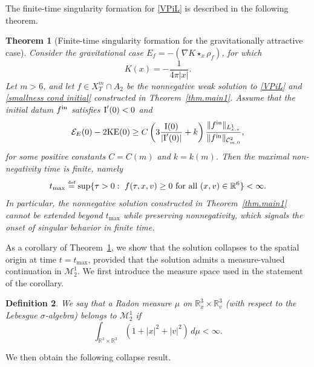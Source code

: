 \documentclass[reqno,11pt,final]{amsart}
\theoremstyle{plain}
\newtheorem{theorem}{Theorem}
\newtheorem{definition}[theorem]{Definition}
\numberwithin{equation}{section}
\numberwithin{theorem}{section}
\newcommand{\eqdef }{\overset{\mbox{\tiny{def}}}{=}}
\begin{document}
The finite-time singularity formation for \eqref{VPiL} is described in the following theorem.

\begin{theorem}[Finite-time singularity formation for the gravitationally attractive case]
\label{thm.main2}
Consider the gravitational case $E_f = -(\nabla K\star_x\rho_f)$, for which
$$
K(x) = -\frac{1}{4\pi|x|}.
$$
Let $m>6$, and let $f \in X_T^m\cap A_2$ be the nonnegative weak solution to
\eqref{VPiL} and \eqref{smallness cond initial} constructed in
Theorem~\ref{thm.main1}. Assume that the initial datum $f^{\textup{in}}$
satisfies $\textup{I}'(0)<0$ and
\begin{align}\label{inertia < energy}
\mathcal{E}_E(0) - 2\textup{KE}(0)
\ge
C\left(3\frac{\textup{I}(0)}{|\textup{I}'(0)|} +k\right)
\frac{\lVert f^{\textup{in}}\rVert_{L^1_{x,v}}}{\|f^{\textup{in}}\|_{\mathcal{C}^2_{m,0}}},
\end{align}
for some positive constants $C=C(m)$ and $k=k(m)$.
Then the maximal non-negativity time is finite, namely
$$
t_{\max}
\eqdef
\sup\{\tau>0:\ f(\tau,x,v)\ge 0
\ \text{for all }(x,v)\in\mathbb{R}^6\}
<\infty .
$$
In particular, the nonnegative solution constructed in
Theorem~\ref{thm.main1} cannot be extended beyond $t_{\max}$ while
preserving nonnegativity, which signals the onset of singular behavior
in finite time.
\end{theorem}

As a corollary of Theorem~\ref{thm.main2}, we show that the solution
collapses to the spatial origin at time $t=t_{\max}$, provided that the
solution admits a measure-valued continuation in $\mathcal{M}^1_2$.
We first introduce the measure space used in the statement of the
corollary.

\begin{definition}
We say that a Radon measure $\mu$ on $\mathbb{R}^3_x\times\mathbb{R}^3_v$
(with respect to the Lebesgue $\sigma$-algebra) belongs to
$\mathcal{M}^1_2$ if
$$
\int_{\mathbb{R}^3\times\mathbb{R}^3}
(1+|x|^2+|v|^2)\,d\mu <\infty .
$$
\end{definition}

We then obtain the following collapse result.
\end{document}
